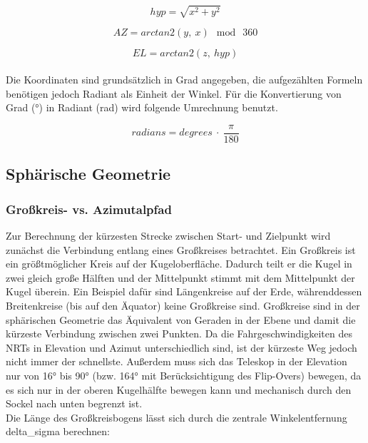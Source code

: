 \begin{equation}
    hyp = \sqrt{x^2 + y^2}
    \label{hypotenuse}
\end{equation}

\begin{equation}
    AZ = arctan2(y,~x)~ \bmod ~360
    \label{arctan2_az}
\end{equation}

\begin{equation}
    EL = arctan2(z,~hyp)
    \label{arctan2_el}
\end{equation}
\\
Die Koordinaten sind grundsätzlich in Grad angegeben, die aufgezählten Formeln benötigen jedoch Radiant als Einheit der Winkel.
Für die Konvertierung von Grad (°) in Radiant (rad) wird folgende Umrechnung benutzt.

\begin{equation}
    radians = degrees ~\cdot~ \frac{\pi}{180}
    \label{degree to radians}
\end{equation}


\subsection{Sphärische Geometrie}

\subsubsection{Großkreis- vs. Azimutalpfad}

Zur Berechnung der kürzesten Strecke zwischen Start- und Zielpunkt wird zunächst die Verbindung entlang eines Großkreises betrachtet. Ein Großkreis ist ein größtmöglicher Kreis auf der Kugeloberfläche. Dadurch teilt er die Kugel in zwei gleich große Hälften und der Mittelpunkt stimmt mit dem Mittelpunkt der Kugel überein. Ein Beispiel dafür sind Längenkreise auf der Erde, währenddessen Breitenkreise (bis auf den Äquator) keine Großkreise sind. Großkreise sind in der sphärischen Geometrie das Äquivalent von Geraden in der Ebene und damit die kürzeste Verbindung zwischen zwei Punkten.
Da die Fahrgeschwindigkeiten des NRTs in Elevation und Azimut unterschiedlich sind, ist der kürzeste Weg jedoch nicht immer der schnellste. Außerdem muss sich das Teleskop in der Elevation nur von 16° bis 90° (bzw. 164° mit Berücksichtigung des Flip-Overs) bewegen, da es sich nur in der oberen Kugelhälfte bewegen kann und mechanisch durch den Sockel nach unten begrenzt ist.
\\
Die Länge des Großkreisbogens lässt sich durch die zentrale Winkelentfernung delta_sigma berechnen:

